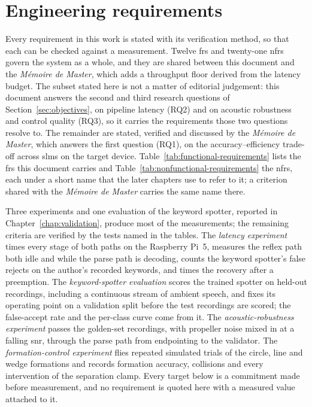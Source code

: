 \section{Engineering requirements}
\label{sec:engineering-requirements}
Every requirement in this work is stated with its verification method, so that each can be checked
against a measurement. Twelve \glspl{fr} and twenty-one \glspl{nfr} govern the system as a whole,
and they are shared between this document and the \emph{M\'emoire de Master}, which adds a
throughput floor derived from the latency budget. The subset stated here is not a matter of
editorial judgement: this document answers the second and third research questions of
Section~\ref{sec:objectives}, on pipeline latency (RQ2) and on acoustic robustness and control
quality (RQ3), so it carries the requirements those two questions resolve to. The remainder are
stated, verified and discussed by the \emph{M\'emoire de Master}, which answers the first question
(RQ1), on the accuracy--efficiency trade-off across \glspl{slm} on the target device.
Table~\ref{tab:functional-requirements} lists the \glspl{fr} this document carries and
Table~\ref{tab:nonfunctional-requirements} the \glspl{nfr}, each under a short name that the later
chapters use to refer to it; a criterion shared with the \emph{M\'emoire de Master} carries the
same name there.

Three experiments and one evaluation of the keyword spotter, reported in
Chapter~\ref{chap:validation}, produce most of the measurements; the remaining criteria are
verified by the tests named in the tables. The \emph{latency experiment} times every stage of both
paths on the Raspberry Pi~5, measures the reflex path both idle and while the parse path is
decoding, counts the keyword spotter's false rejects on the author's recorded keywords, and times
the recovery after a preemption. The \emph{keyword-spotter evaluation} scores the trained spotter
on held-out recordings, including a continuous stream of ambient speech, and fixes its operating
point on a validation split before the test recordings are scored; the false-accept rate and the
per-class curve come from it. The \emph{acoustic-robustness experiment} passes the golden-set
recordings, with propeller noise mixed in at a falling \gls{snr}, through the parse path from
endpointing to the validator. The \emph{formation-control experiment} flies repeated simulated
trials of the circle, line and wedge formations and records formation accuracy, collisions and
every intervention of the separation clamp. Every target below is a commitment made before
measurement, and no requirement is quoted here with a measured value attached to it.

